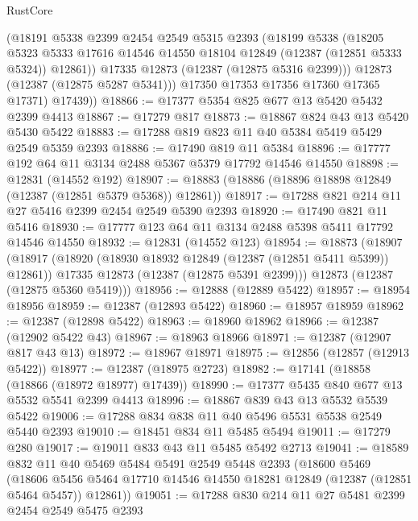\begin{lexlean}{RustCore}
\begin{coremodule}
            (@18191
              @5338
              @2399
              @2454
              @2549
              @5315
              @2393
              (@18199
                @5338
                (@18205
                  @5323
                  @5333
                  @17616
                  @14546
                  @14550
                  @18104
                  @12849
                  (@12387 (@12851 @5333 @5324))
                  @12861))
              @17335
              @12873
              (@12387 (@12875 @5316 @2399)))
            @12873
            (@12387 (@12875 @5287 @5341)))
          @17350
          @17353
          @17356
          @17360
          @17365
          @17371)
        @17439))
@18866 := @17377 @5354 @825 @677 @13 @5420 @5432 @2399 @4413
@18867 := @17279 @817
@18873 := @18867 @824 @43 @13 @5420 @5430 @5422
@18883 := @17288 @819 @823 @11 @40 @5384 @5419 @5429 @2549 @5359 @2393
@18886 := @17490 @819 @11 @5384
@18896 := @17777 @192 @64 @11 @3134 @2488 @5367 @5379 @17792 @14546 @14550
@18898 := @12831 (@14552 @192)
@18907 := @18883 (@18886 (@18896 @18898 @12849 (@12387 (@12851 @5379 @5368)) @12861))
@18917 := @17288 @821 @214 @11 @27 @5416 @2399 @2454 @2549 @5390 @2393
@18920 := @17490 @821 @11 @5416
@18930 := @17777 @123 @64 @11 @3134 @2488 @5398 @5411 @17792 @14546 @14550
@18932 := @12831 (@14552 @123)
@18954 := @18873
    (@18907
      (@18917
        (@18920 (@18930 @18932 @12849 (@12387 (@12851 @5411 @5399)) @12861))
        @17335
        @12873
        (@12387 (@12875 @5391 @2399)))
      @12873
      (@12387 (@12875 @5360 @5419)))
@18956 := @12888 (@12889 @5422)
@18957 := @18954 @18956
@18959 := @12387 (@12893 @5422)
@18960 := @18957 @18959
@18962 := @12387 (@12898 @5422)
@18963 := @18960 @18962
@18966 := @12387 (@12902 @5422 @43)
@18967 := @18963 @18966
@18971 := @12387 (@12907 @817 @43 @13)
@18972 := @18967 @18971
@18975 := @12856 (@12857 (@12913 @5422))
@18977 := @12387 (@18975 @2723)
@18982 := @17141 (@18858 (@18866 (@18972 @18977) @17439))
@18990 := @17377 @5435 @840 @677 @13 @5532 @5541 @2399 @4413
@18996 := @18867 @839 @43 @13 @5532 @5539 @5422
@19006 := @17288 @834 @838 @11 @40 @5496 @5531 @5538 @2549 @5440 @2393
@19010 := @18451 @834 @11 @5485 @5494
@19011 := @17279 @280
@19017 := @19011 @833 @43 @11 @5485 @5492 @2713
@19041 := @18589
    @832
    @11
    @40
    @5469
    @5484
    @5491
    @2549
    @5448
    @2393
    (@18600
      @5469
      (@18606 @5456 @5464 @17710 @14546 @14550 @18281 @12849 (@12387 (@12851 @5464 @5457)) @12861))
@19051 := @17288 @830 @214 @11 @27 @5481 @2399 @2454 @2549 @5475 @2393

\end{coremodule}
\end{lexlean}
